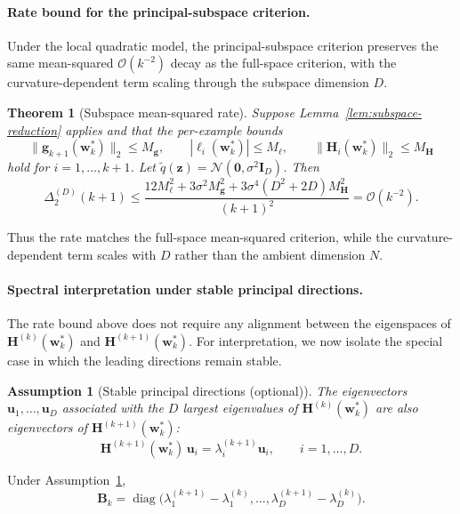 \documentclass[10pt]{article}
\theoremstyle{plain}
\newtheorem{assumption}{Assumption}
\newtheorem{theorem}{Theorem}
\theoremstyle{remark}
\begin{document}
\paragraph{Rate bound for the principal-subspace criterion.}
Under the local quadratic model, the principal-subspace criterion preserves the same mean-squared $\mathcal O(k^{-2})$ decay as the full-space criterion, with the curvature-dependent term scaling through the subspace dimension $D$.

\begin{theorem}[Subspace mean-squared rate]
\label{thm:subspace-rate}
Suppose Lemma~\ref{lem:subspace-reduction} applies and that the per-example bounds
\[
\|\mathbf g_{k+1}(\mathbf w_k^*)\|_2 \le M_{\mathbf g},
\qquad
|\ell_i(\mathbf w_k^*)| \le M_\ell,
\qquad
\|\mathbf H_i(\mathbf w_k^*)\|_2 \le M_{\mathbf H}
\]
hold for $i=1,\dots,k+1$.
Let $\tilde q(\mathbf z)=\mathcal N(\mathbf 0,\sigma^2\mathbf I_D)$.
Then
\begin{equation}
\label{eq:subspace-rate-bound}
\Delta_2^{(D)}(k+1)
\le
\frac{
12M_\ell^2
+
3\sigma^2 M_{\mathbf g}^2
+
3\sigma^4(D^2+2D)M_{\mathbf H}^2
}{(k+1)^2}
=
\mathcal O(k^{-2}).
\end{equation}
\end{theorem}

Thus the rate matches the full-space mean-squared criterion, while the curvature-dependent term scales with $D$ rather than the ambient dimension $N$.

\paragraph{Spectral interpretation under stable principal directions.}
The rate bound above does not require any alignment between the eigenspaces of $\mathbf H^{(k)}(\mathbf w_k^*)$ and $\mathbf H^{(k+1)}(\mathbf w_k^*)$.
For interpretation, we now isolate the special case in which the leading directions remain stable.

\begin{assumption}[Stable principal directions (optional)]
\label{ass:stable-principal}
The eigenvectors $\mathbf u_1,\dots,\mathbf u_D$ associated with the $D$ largest eigenvalues of $\mathbf H^{(k)}(\mathbf w_k^*)$ are also eigenvectors of $\mathbf H^{(k+1)}(\mathbf w_k^*)$:
\[
\mathbf H^{(k+1)}(\mathbf w_k^*)\,\mathbf u_i
=
\lambda_i^{(k+1)}\mathbf u_i,
\qquad i=1,\dots,D.
\]
\end{assumption}

Under Assumption~\ref{ass:stable-principal},
\[
\mathbf B_k
=
\operatorname{diag}\bigl(
\lambda_1^{(k+1)}-\lambda_1^{(k)},
\dots,
\lambda_D^{(k+1)}-\lambda_D^{(k)}
\bigr).
\]
\end{document}
